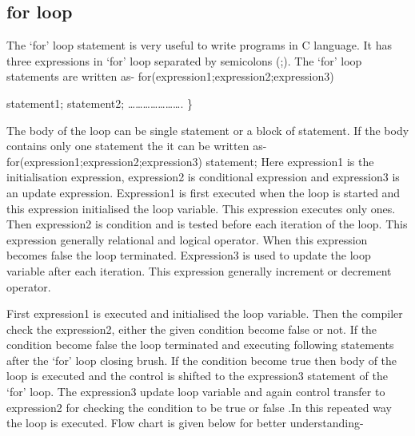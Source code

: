 \documentclass[conference]{IEEEtran}
\begin{document}
\subsection{for loop}
The ‘for’ loop statement is very useful to write programs in C language. It has three expressions in ‘for’ loop separated by semicolons (;). The ‘for’ loop statements are written as-
\linebreak
\linebreak
\hspace*{1cm}for(expression1;expression2;expression3){
\linebreak
\hspace*{2cm}statement1;
\linebreak
\hspace*{2cm}statement2;
\linebreak
………………….
\linebreak
\}
\linebreak
\linebreak

The body of the loop can be single statement or a block of statement. If the body contains only one statement the it can be written as-
\linebreak
\linebreak
\hspace*{1cm}for(expression1;expression2;expression3)
\hspace*{2cm}statement;
\linebreak
\linebreak
\linebreak
Here expression1 is the initialisation expression, expression2 is conditional expression and expression3 is an update expression. Expression1 is first executed when the loop is started and this expression initialised the loop variable. This expression executes only ones. Then expression2 is condition and is tested before each iteration of the loop. This expression generally relational and logical operator. When this expression becomes false the loop terminated. Expression3 is used to update the loop variable after each iteration. This expression generally increment or decrement operator.

First expression1 is executed and initialised the loop variable. Then the compiler check the expression2, either the given condition become false or not. If the condition become false the loop terminated and executing following statements after the ‘for’ loop closing brush. If the condition become true then body of the loop is executed and the control is shifted to the expression3 statement of the ‘for’ loop. The expression3 update loop variable and again control transfer to expression2 for checking the condition to be true or false .In this repeated way the loop is executed. Flow chart is given below for better understanding-

}
\end{document}
